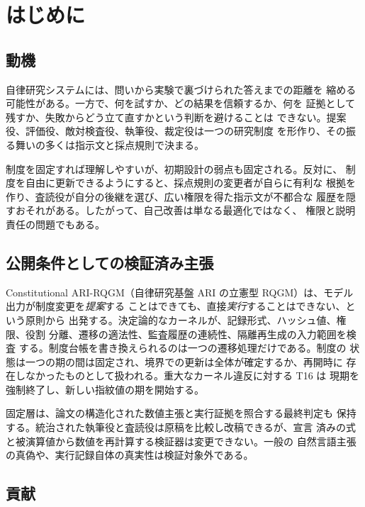 \section{はじめに}\label{sec:intro}

\subsection{動機}\label{sec:intro:motivation}

自律研究システムには、問いから実験で裏づけられた答えまでの距離を
縮める可能性がある。一方で、何を試すか、どの結果を信頼するか、何を
証拠として残すか、失敗からどう立て直すかという判断を避けることは
できない。提案役、評価役、敵対検査役、執筆役、裁定役は一つの研究制度
を形作り、その振る舞いの多くは指示文と採点規則で決まる。

制度を固定すれば理解しやすいが、初期設計の弱点も固定される。反対に、
制度を自由に更新できるようにすると、採点規則の変更者が自らに有利な
根拠を作り、査読役が自分の後継を選び、広い権限を得た指示文が不都合な
履歴を隠すおそれがある。したがって、自己改善は単なる最適化ではなく、
権限と説明責任の問題でもある。

\subsection{公開条件としての検証済み主張}\label{sec:intro:verified}

Constitutional ARI-RQGM（自律研究基盤 ARI の立憲型 RQGM）は、モデル
出力が制度変更を\emph{提案}する
ことはできても、直接\emph{実行}することはできない、という原則から
出発する。決定論的なカーネルが、記録形式、ハッシュ値、権限、役割
分離、遷移の適法性、監査履歴の連続性、隔離再生成の入力範囲を検査
する。制度台帳を書き換えられるのは一つの遷移処理だけである。制度の
状態は一つの期の間は固定され、境界での更新は全体が確定するか、再開時に
存在しなかったものとして扱われる。重大なカーネル違反に対する T16 は
現期を強制終了し、新しい指紋値の期を開始する。

固定層は、論文の構造化された数値主張と実行証拠を照合する最終判定も
保持する。統治された執筆役と査読役は原稿を比較し改稿できるが、宣言
済みの式と被演算値から数値を再計算する検証器は変更できない。一般の
自然言語主張の真偽や、実行記録自体の真実性は検証対象外である。

\subsection{貢献}\label{sec:intro:contrib}

